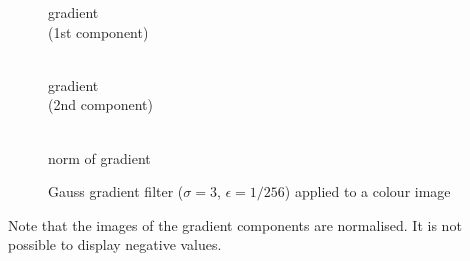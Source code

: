 \documentclass[12pt,a4paper,oneside,openright]{book}
\begin{document}
\begin{CJK}{UTF8}{}
\begin{figure}[htbp]
\begin{center}
\begin{minipage}[t]{.24\textwidth}
\begin{center}
         gradient\\(1st component)
       \end{center}
     \end{minipage}
     \begin{minipage}[t]{.24\textwidth}
       \begin{center}
         \\
         gradient\\(2nd component)
       \end{center}
     \end{minipage}
     \begin{minipage}[t]{.24\textwidth}
       \begin{center}
         \\
         norm of gradient
       \end{center}
     \end{minipage}
     \caption{Gauss gradient filter ($\sigma=3$, $\epsilon=1/256$) applied to a colour image\label{fig:gaussgrad}}
   \end{center}
\end{figure}
Note that the images of the gradient components are normalised. It is not possible to display negative values.


\end{CJK}
\end{document}
